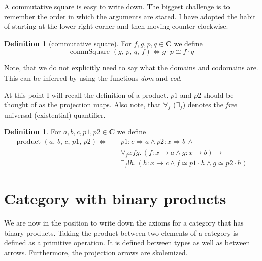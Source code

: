 \documentclass[a4paper, 11pt]{article}
\theoremstyle{definition}
\newtheorem{definition}[theorem]{Definition}
\newcommand{\cat}{%
	\mathbf %
}
\newcommand{\notion}[1]{\text{#1 }}
\newcommand{\commSquare}[4]{\notion{commSquare} (#1, \, #2, \, #3, \, #4)}
\newcommand{\product}[5]{\notion{product} (#1, \, #2, \, #3, \, #4, \, #5)}
\begin{document}
\noindent A commutative square is easy to write down. The biggest challenge is to remember the order in which the arguments are stated. I have adopted the habit of starting at the lower right corner and then moving counter-clockwise.

\begin{definition}[commutative square]
	For $f, g, p, q \in \cat C$ we define
	\[\commSquare{g}{p}{q}{f} \Longleftrightarrow  g \cdot p \cong f \cdot q \]
\end{definition} 

Note, that we do not explicitly need to say what the domains and codomains are. This can be inferred by using the functions \emph{dom} and \emph{cod}.

At this point I will recall the definition of a product. $p1$ and $p2$ should be thought of as the projection maps. Also note, that $\forall_f$ ($\exists_f$) denotes the \emph{free} universal (existential) quantifier.

\begin{definition}
	For $a, b, c, p1, p2 \in \cat C$ we define
	\begin{align*}
		\product{a}{b}{c}{p1}{p2} \Longleftrightarrow \quad & p1:c\Rightarrow a \wedge p2:x\Rightarrow b \, \wedge \\
		& \forall_f x f g. \, (f:x\rightarrow a \wedge g:x\rightarrow b) \longrightarrow \\
		& \exists_f!h. \, (h:x\rightarrow c \wedge f \simeq p1 \cdot h \wedge g \simeq p2 \cdot h)
	\end{align*}  
\end{definition}

\section{Category with binary products}

We are now in the position to write down the axioms for a category that has binary products. Taking the product between two elements of a category is defined as a primitive operation. It is defined between types as well as between arrows. Furthermore, the projection arrows are skolemized.
\end{document}
